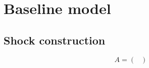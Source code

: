
\section{Baseline model}
\label{sec:baseline_model}

\subsection{Shock construction}
\label{sec:shock_construction}



\begin{equation}
    A =
    \begin{pmatrix}
        
    \end{pmatrix}
\end{equation}

